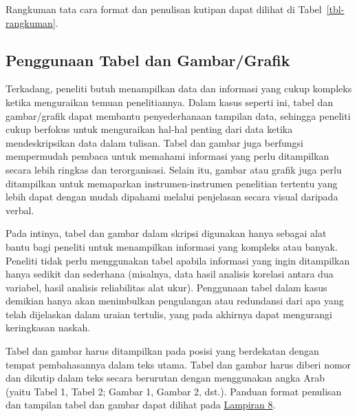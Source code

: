 \documentclass[
  indonesian,
  letterpaper,
]{scrbook}
\begin{document}
Rangkuman tata cara format dan penulisan kutipan dapat dilihat di
Tabel~\ref{tbl-rangkuman}.

\subsection{Penggunaan Tabel dan
Gambar/Grafik}\label{penggunaan-tabel-dan-gambargrafik}

Terkadang, peneliti butuh menampilkan data dan informasi yang cukup
kompleks ketika menguraikan temuan penelitiannya. Dalam kasus seperti
ini, tabel dan gambar/grafik dapat membantu penyederhanaan tampilan
data, sehingga peneliti cukup berfokus untuk menguraikan hal-hal penting
dari data ketika mendeskripsikan data dalam tulisan. Tabel dan gambar
juga berfungsi mempermudah pembaca untuk memahami informasi yang perlu
ditampilkan secara lebih ringkas dan terorganisasi. Selain itu, gambar
atau grafik juga perlu ditampilkan untuk memaparkan instrumen-instrumen
penelitian tertentu yang lebih dapat dengan mudah dipahami melalui
penjelasan secara visual daripada verbal.

Pada intinya, tabel dan gambar dalam skripsi digunakan hanya sebagai
alat bantu bagi peneliti untuk menampilkan informasi yang kompleks atau
banyak. Peneliti tidak perlu menggunakan tabel apabila informasi yang
ingin ditampilkan hanya sedikit dan sederhana (misalnya, data hasil
analisis korelasi antara dua variabel, hasil analisis reliabilitas alat
ukur). Penggunaan tabel dalam kasus demikian hanya akan menimbulkan
pengulangan atau redundansi dari apa yang telah dijelaskan dalam uraian
tertulis, yang pada akhirnya dapat mengurangi keringkasan naskah.

Tabel dan gambar harus ditampilkan pada posisi yang berdekatan dengan
tempat pembahasannya dalam teks utama. Tabel dan gambar harus diberi
nomor dan dikutip dalam teks secara berurutan dengan menggunakan angka
Arab (yaitu Tabel 1, Tabel 2; Gambar 1, Gambar 2, dst.). Panduan format
penulisan dan tampilan tabel dan gambar dapat dilihat pada
\hyperref[_Lampiran_8_Format]{Lampiran 8}.
\end{document}
